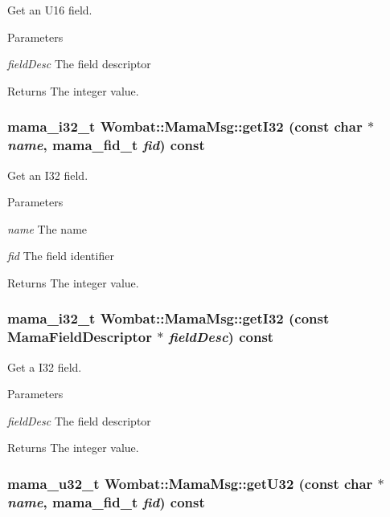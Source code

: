 Get an U16 field. 
\begin{DoxyParams}{Parameters}
\item[{\em fieldDesc}]The field descriptor \end{DoxyParams}
\begin{DoxyReturn}{Returns}
The integer value. 
\end{DoxyReturn}
\hypertarget{classWombat_1_1MamaMsg_a67fbfdf37ade025708dfe67bf5e91d9e}{
\subsubsection[{getI32}]{\setlength{\rightskip}{0pt plus 5cm}mama\_\-i32\_\-t Wombat::MamaMsg::getI32 (const char $\ast$ {\em name}, \/  mama\_\-fid\_\-t {\em fid}) const}}
\label{classWombat_1_1MamaMsg_a67fbfdf37ade025708dfe67bf5e91d9e}


Get an I32 field. 
\begin{DoxyParams}{Parameters}
\item[{\em name}]The name \item[{\em fid}]The field identifier \end{DoxyParams}
\begin{DoxyReturn}{Returns}
The integer value. 
\end{DoxyReturn}
\hypertarget{classWombat_1_1MamaMsg_aa452365bd4997f223da26fdb53715a5a}{
\subsubsection[{getI32}]{\setlength{\rightskip}{0pt plus 5cm}mama\_\-i32\_\-t Wombat::MamaMsg::getI32 (const {\bf MamaFieldDescriptor} $\ast$ {\em fieldDesc}) const}}
\label{classWombat_1_1MamaMsg_aa452365bd4997f223da26fdb53715a5a}


Get a I32 field. 
\begin{DoxyParams}{Parameters}
\item[{\em fieldDesc}]The field descriptor \end{DoxyParams}
\begin{DoxyReturn}{Returns}
The integer value. 
\end{DoxyReturn}
\hypertarget{classWombat_1_1MamaMsg_aed31ea478ae25b7ad36644a39c50bfc5}{
\subsubsection[{getU32}]{\setlength{\rightskip}{0pt plus 5cm}mama\_\-u32\_\-t Wombat::MamaMsg::getU32 (const char $\ast$ {\em name}, \/  mama\_\-fid\_\-t {\em fid}) const}}
\label{classWombat_1_1MamaMsg_aed31ea478ae25b7ad36644a39c50bfc5}



